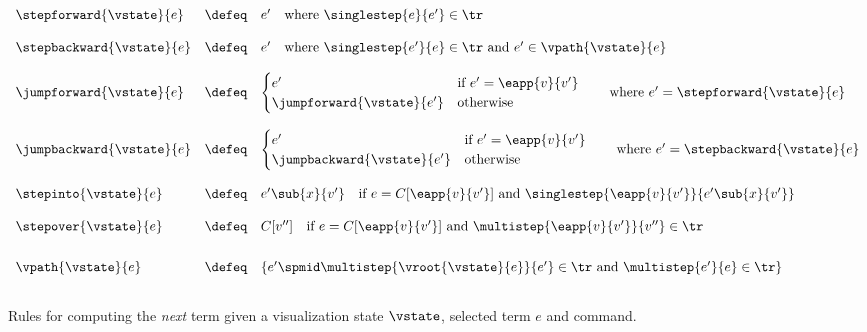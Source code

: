 \begin{figure*}[t]
\[
\begin{array}{lcl}
\stepforward{\vstate}{e}  & \defeq
  & e' \quad \mbox{where } \singlestep{e}{e'} \in \tr \\ \\

\stepbackward{\vstate}{e} & \defeq
  & e' \quad \mbox{where } \singlestep{e'}{e} \in \tr \mbox{ and } e' \in \vpath{\vstate}{e} \\ \\

\jumpforward{\vstate}{e} & \defeq
  & \begin{cases}
    e'                         & \mbox{if } e' = \eapp{v}{v'} \\
    \jumpforward{\vstate}{e'}  & \text{otherwise}
    \end{cases}
    \mbox{\qquad where } e' = \stepforward{\vstate}{e} \\ \\

\jumpbackward{\vstate}{e} & \defeq
  & \begin{cases}
    e'                         & \mbox{if } e' = \eapp{v}{v'} \\
    \jumpbackward{\vstate}{e'} & \text{otherwise}
    \end{cases}
    \mbox{\qquad where } e' = \stepbackward{\vstate}{e} \\ \\

\stepinto{\vstate}{e} & \defeq
  & e'\sub{x}{v'} \quad \mbox{if } e = C[\eapp{v}{v'}] \mbox{ and } \singlestep{\eapp{v}{v'}}{e'\sub{x}{v'}}  \\ \\

\stepover{\vstate}{e} & \defeq
  & C[v''] \quad \mbox{if } e = C[\eapp{v}{v'}] \mbox{ and } \multistep{\eapp{v}{v'}}{v''} \in \tr \\[0.25in]

\vpath{\vstate}{e} & \defeq
  & \{e' \spmid \multistep{\vroot{\vstate}{e}}{e'} \in \tr
                \mbox{ and }
                \multistep{e'}{e} \in \tr \} \\[0.15in]
\end{array}
\]
\caption{Rules for computing the \emph{next} term given a
         visualization state $\vstate$, selected term $e$
         and command.}
\label{fig:traversing-graph}
\end{figure*}

